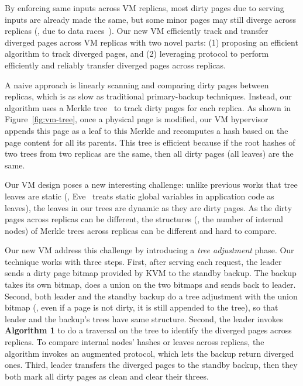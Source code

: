 By enforcing same inputs across VM replicas, most dirty pages due to serving 
inputs are already made the same, but some minor pages may still diverge across 
replicas (\eg, due to data races~\cite{lu:concurrency-bugs}). Our new VM 
efficiently track and transfer diverged pages across VM replicas with two novel 
parts: (1) proposing an efficient algorithm to track diverged pages, 
and (2) leveraging \falcon protocol to perform efficiently and reliably 
transfer diverged pages across replicas.

A naive approach is linearly scanning and comparing dirty pages between 
replicas, which is as slow as traditional primary-backup techniques. Instead, 
our algorithm uses a Merkle tree~\cite{eve:osdi12} to track dirty pages for 
each replica. As shown in Figure~\ref{fig:vm-tree}, once a physical page is 
modified, our VM hypervisor appends this page as a leaf to this Merkle 
and recomputes a hash based on the page content for all its parents. This tree 
is efficient because if the root hashes of two trees from two replicas are the 
same, then all dirty pages (all leaves) are the same.

Our VM design poses a new interesting challenge: unlike previous works that 
tree leaves are static (\eg, Eve~\cite{eve:osdi12} treats static global 
variables in application code as leaves), the leaves in our trees are dynamic as 
they are dirty pages. As the dirty pages across replicas can be different, the 
structures (\ie, the number of internal nodes) of Merkle trees across replicas 
can be different and hard to compare.

Our new VM address this challenge by introducing a \emph{tree adjustment} phase. 
Our technique works with three steps. First, after serving each request, the 
leader sends a dirty page bitmap provided by KVM to the standby backup. The 
backup takes its own bitmap, does a union on the two bitmaps and sends back to 
leader. Second, both leader and the standby backup do a tree adjustment with 
the union bitmap (\eg, even if a page is not dirty, it is still appended to the 
tree), so that leader and the backup's trees have same structure. Second, the 
leader invokes \textbf{Algorithm 1} to do a  traversal on the 
tree to identify the diverged pages across replicas. To compare internal nodes' 
hashes or leaves across replicas, the algorithm invokes an augmented \falcon 
protocol, which lets the backup return diverged ones. Third, leader transfers 
the diverged pages to the standby backup, then they both mark all dirty pages 
as clean and clear their threes.

